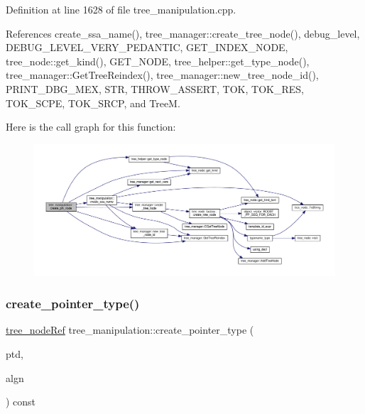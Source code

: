 Definition at line 1628 of file tree\+\_\+manipulation.\+cpp.



References create\+\_\+ssa\+\_\+name(), tree\+\_\+manager\+::create\+\_\+tree\+\_\+node(), debug\+\_\+level, D\+E\+B\+U\+G\+\_\+\+L\+E\+V\+E\+L\+\_\+\+V\+E\+R\+Y\+\_\+\+P\+E\+D\+A\+N\+T\+IC, G\+E\+T\+\_\+\+I\+N\+D\+E\+X\+\_\+\+N\+O\+DE, tree\+\_\+node\+::get\+\_\+kind(), G\+E\+T\+\_\+\+N\+O\+DE, tree\+\_\+helper\+::get\+\_\+type\+\_\+node(), tree\+\_\+manager\+::\+Get\+Tree\+Reindex(), tree\+\_\+manager\+::new\+\_\+tree\+\_\+node\+\_\+id(), P\+R\+I\+N\+T\+\_\+\+D\+B\+G\+\_\+\+M\+EX, S\+TR, T\+H\+R\+O\+W\+\_\+\+A\+S\+S\+E\+RT, T\+OK, T\+O\+K\+\_\+\+R\+ES, T\+O\+K\+\_\+\+S\+C\+PE, T\+O\+K\+\_\+\+S\+R\+CP, and TreeM.

Here is the call graph for this function\+:
\nopagebreak
\begin{figure}[H]
\begin{center}
\leavevmode
\includegraphics[width=350pt]{d0/d99/classtree__manipulation_a6106305b8de3d51daede502c7fbfb540_cgraph}
\end{center}
\end{figure}
\mbox{\label{classtree__manipulation_a6d88570241f098107bc756f50011e3b4}} 
\subsubsection{\texorpdfstring{create\+\_\+pointer\+\_\+type()}{create\_pointer\_type()}}
{\footnotesize\ttfamily \hyperlink{tree__node_8hpp_a6ee377554d1c4871ad66a337eaa67fd5}{tree\+\_\+node\+Ref} tree\+\_\+manipulation\+::create\+\_\+pointer\+\_\+type (\begin{DoxyParamCaption}\item[{const \hyperlink{tree__node_8hpp_a3cf5d02292c940f3892425a5b5fdec3c}{tree\+\_\+node\+Const\+Ref} \&}]{ptd,  }\item[{unsigned int}]{algn }\end{DoxyParamCaption}) const}



